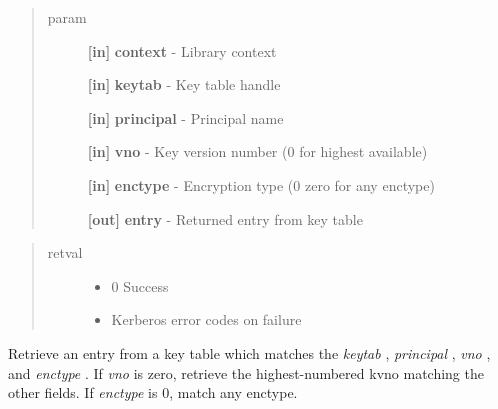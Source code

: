 \documentclass[letterpaper,10pt,english]{sphinxmanual}
\begin{document}
\begin{fulllineitems}
\label{appdev/refs/api/krb5_kt_get_entry:c.krb5_kt_get_entry}
\end{fulllineitems}

\begin{quote}\begin{description}
\item[{param}] \leavevmode
\textbf{{[}in{]}} \textbf{context} - Library context

\textbf{{[}in{]}} \textbf{keytab} - Key table handle

\textbf{{[}in{]}} \textbf{principal} - Principal name

\textbf{{[}in{]}} \textbf{vno} - Key version number (0 for highest available)

\textbf{{[}in{]}} \textbf{enctype} - Encryption type (0 zero for any enctype)

\textbf{{[}out{]}} \textbf{entry} - Returned entry from key table

\end{description}\end{quote}
\begin{quote}\begin{description}
\item[{retval}] \leavevmode\begin{itemize}
\item {} 
0   Success

\item {} 
Kerberos   error codes on failure

\end{itemize}

\end{description}\end{quote}

Retrieve an entry from a key table which matches the \emph{keytab} , \emph{principal} , \emph{vno} , and \emph{enctype} . If \emph{vno} is zero, retrieve the highest-numbered kvno matching the other fields. If \emph{enctype} is 0, match any enctype.
\end{document}
